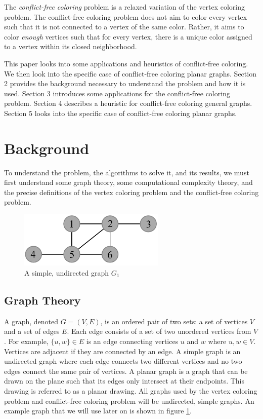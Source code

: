 \documentclass{sig-alternate}
\begin{document}
The \emph{conflict-free coloring} problem is a relaxed variation of the vertex coloring problem. The conflict-free coloring problem does not aim to color every vertex such that it is not connected to a vertex of the same color. Rather, it aims to color \emph{enough} vertices such that for every vertex, there is a unique color assigned to a vertex within its closed neighborhood.

This paper looks into some applications and heuristics of conflict-free coloring. We then look into the specific case of conflict-free coloring planar graphs. Section 2 provides the background necessary to understand the problem and how it is used. Section 3 introduces some applications for the conflict-free coloring problem. Section 4 describes a heuristic for conflict-free coloring general graphs. Section 5 looks into the specific case of conflict-free coloring planar graphs.


\section{Background}
\label{sec:background}
To understand the problem, the algorithms to solve it, and its results, we must first understand some graph theory, some computational complexity theory, and the precise definitions of the vertex coloring problem and the conflict-free coloring problem.

\begin{figure}[h]
	\centering
	\includegraphics[width=7cm]{../figures/example.pdf}
	\caption{A simple, undirected graph $G_1$}\label{fig:graph}
\end{figure}

\subsection{Graph Theory}
\label{sec:graphtheory}

A graph, denoted $G=(V,E)$, is an ordered pair of two sets: a set of vertices $V$ and a set of edges $E$. Each edge consists of a set of two unordered vertices from $V$. For example, $\{u, w\} \in E$ is an edge connecting vertices $u$ and $w$ where $u,w \in V$. Vertices are adjacent if they are connected by an edge. A simple graph is an undirected graph where each edge connects two different vertices and no two edges connect the same pair of vertices. A planar graph is a graph that can be drawn on the plane such that its edges only intersect at their endpoints. This drawing is referred to as a planar drawing. All graphs used by the vertex coloring problem and conflict-free coloring problem will be undirected, simple graphs. An example graph that we will use later on is shown in figure \ref{fig:graph}.
\end{document}
